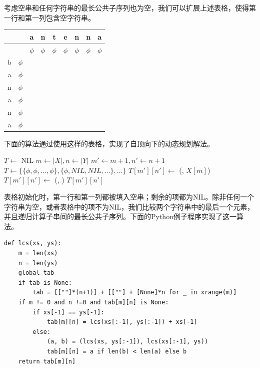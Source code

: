\documentclass[UTF8]{article}
\begin{document}
考虑空串和任何字符串的最长公共子序列也为空，我们可以扩展上述表格，使得第一行和第一列包含空字符串。

\begin{tabular}{|c|c|c|c|c|c|c|c|c|}
\hline
 & & a & n & t & e & n & n & a \\
\hline
 & & $\phi$ & $\phi$ & $\phi$ & $\phi$ & $\phi$ & $\phi$ & $\phi$ \\
\hline
b & $\phi$ & & & & & & & \\
\hline
a & $\phi$ & & & & & & & \\
\hline
n & $\phi$ & & & & & & & \\
\hline
a & $\phi$ & & & & & & & \\
\hline
n & $\phi$ & & & & & & & \\
\hline
a & $\phi$ & & & & & & & \\
\hline
\end{tabular}

下面的算法通过使用这样的表格，实现了自顶向下的动态规划解法。

\begin{algorithmic}[1]
\State $T \gets$ NIL
  \State $m \gets |X|, n \gets |Y|$
  \State $m' \gets m+1, n' \gets n+1$
    \State $T \gets \{\{\phi, \phi, ..., \phi\}, \{\phi, NIL, NIL, ...\}, ...\}$ 
  \EndIf
      \State $T[m'][n'] \gets$ (, $X[m]$)
    \Else
      \State $T[m'][n'] \gets$ (, )
    \EndIf
  \EndIf
  \State \Return $T[m'][n']$
\EndFunction
\end{algorithmic}

表格初始化时，第一行和第一列都被填入空串；剩余的项都为NIL。除非任何一个字符串为空，或者表格中的项不为NIL，我们比较两个字符串中的最后一个元素，并且递归计算子串间的最长公共子序列。下面的Python例子程序实现了这一算法。

\lstset{language=Python}
\begin{lstlisting}
def lcs(xs, ys):
    m = len(xs)
    n = len(ys)
    global tab
    if tab is None:
        tab = [[""]*(n+1)] + [[""] + [None]*n for _ in xrange(m)]
    if m != 0 and n !=0 and tab[m][n] is None:
        if xs[-1] == ys[-1]:
            tab[m][n] = lcs(xs[:-1], ys[:-1]) + xs[-1]
        else:
            (a, b) = (lcs(xs, ys[:-1]), lcs(xs[:-1], ys))
            tab[m][n] = a if len(b) < len(a) else b
    return tab[m][n]
\end{lstlisting}
\end{document}
